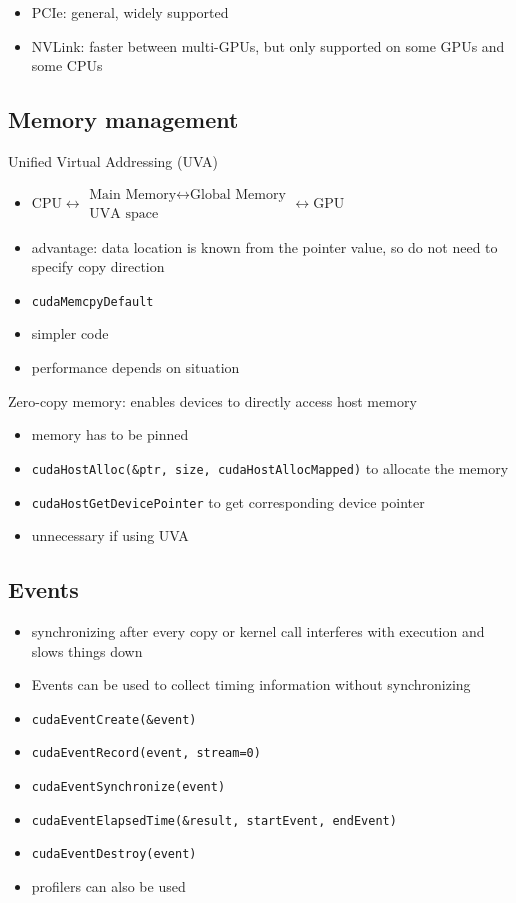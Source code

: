\documentclass{article}
\begin{document}
\begin{itemize}
\item PCIe: general, widely supported
\item NVLink: faster between multi-GPUs, but only supported on some GPUs and some CPUs

\end{itemize}
\subsection{Memory management}

Unified Virtual Addressing (UVA)

\begin{itemize}
\item $\text{CPU} \longleftrightarrow \substack{\boxed{\text{Main Memory} \longleftrightarrow \text{Global Memory}}\\\text{UVA space}} \longleftrightarrow \text{GPU}$
\item advantage: data location is known from the pointer value, so do not need to specify copy direction
\item \texttt{cudaMemcpyDefault}
\item simpler code
\item performance depends on situation

\end{itemize}
Zero-copy memory: enables devices to directly access host memory

\begin{itemize}
\item memory has to be pinned
\item \texttt{cudaHostAlloc(\&ptr, size, cudaHostAllocMapped)} to allocate the memory
\item \texttt{cudaHostGetDevicePointer} to get corresponding device pointer
\item unnecessary if using UVA

\end{itemize}
\subsection{Events}

\begin{itemize}
\item synchronizing after every copy or kernel call interferes with execution and slows things down
\item Events can be used to collect timing information without synchronizing
\item \texttt{cudaEventCreate(\&event)}
\item \texttt{cudaEventRecord(event, stream=0)}
\item \texttt{cudaEventSynchronize(event)}
\item \texttt{cudaEventElapsedTime(\&result, startEvent, endEvent)}
\item \texttt{cudaEventDestroy(event)}
\item profilers can also be used

\end{itemize}
\end{document}
